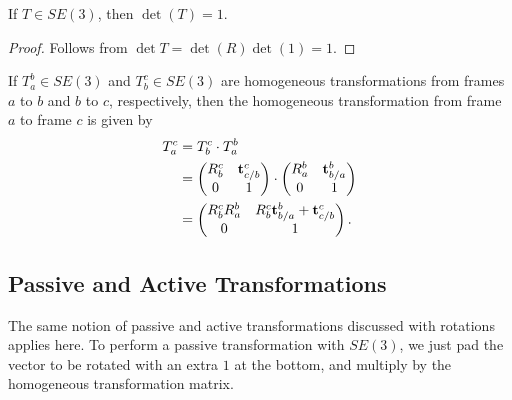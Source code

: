 \begin{lemma} [Determinant]
If $T\in SE(3)$, then $\det(T)=1$.
\end{lemma}
\begin{proof}
Follows from $\det{T}=\det(R)\det(1)=1$.
\end{proof}
\begin{lemma} [Concatination]
If $T_a^b\in SE(3)$ and $T_b^c\in SE(3)$ are homogeneous transformations from frames $a$ to $b$ and $b$ to $c$, respectively, then the homogeneous transformation from frame $a$ to frame $c$ is given by
\begin{align*}
T_{a}^{c} & =T_{b}^{c}\cdot T_{a}^{b}\\
 & =\begin{pmatrix}R_{b}^{c} & \mathbf{t}_{c/b}^{c}\\
0 & 1
\end{pmatrix}\cdot\begin{pmatrix}R_{a}^{b} & \mathbf{t}_{b/a}^{b}\\
0 & 1
\end{pmatrix}\\
 & =\begin{pmatrix}R_{b}^{c}R_{a}^{b} & R_{b}^{c}\mathbf{t}_{b/a}^{b}+\mathbf{t}_{c/b}^{c}\\
0 & 1
\end{pmatrix}.
\end{align*}
\end{lemma}

\subsection{Passive and Active Transformations}

The same notion of passive and active transformations discussed with
rotations applies here. To perform a passive transformation with $SE(3)$,
we just pad the vector to be rotated with an extra $1$ at the bottom,
and multiply by the homogeneous transformation matrix. 

